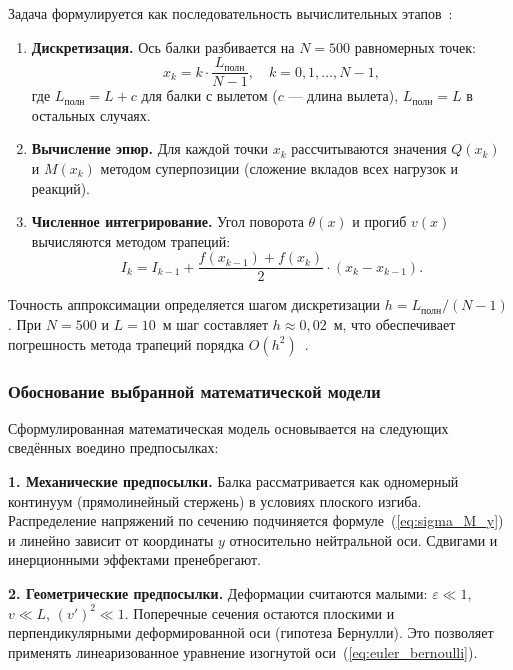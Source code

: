 Задача формулируется как последовательность вычислительных этапов~\cite{bahvalov, samarsky}:

\begin{enumerate}
  \item \textbf{Дискретизация.} Ось балки разбивается на $N = 500$ равномерных точек:
  \begin{equation}
    x_k = k \cdot \frac{L_{\text{полн}}}{N - 1}, \quad k = 0, 1, \ldots, N-1,
    \label{eq:discretization}
  \end{equation}
  где $L_{\text{полн}} = L + c$ для балки с вылетом ($c$ --- длина вылета), $L_{\text{полн}} = L$ в остальных случаях.

  \item \textbf{Вычисление эпюр.} Для каждой точки $x_k$ рассчитываются значения $Q(x_k)$ и $M(x_k)$ методом суперпозиции (сложение вкладов всех нагрузок и реакций).

  \item \textbf{Численное интегрирование.} Угол поворота $\theta(x)$ и прогиб $v(x)$ вычисляются методом трапеций:
  \begin{equation}
    I_{k} = I_{k-1} + \frac{f(x_{k-1}) + f(x_k)}{2} \cdot (x_k - x_{k-1}).
    \label{eq:trapezoid}
  \end{equation}

\end{enumerate}

Точность аппроксимации определяется шагом дискретизации $h = L_{\text{полн}} / (N-1)$. При $N = 500$ и $L = 10$~м шаг составляет $h \approx 0{,}02$~м, что обеспечивает погрешность метода трапеций порядка $O(h^2)$~\cite{bahvalov}.

\subsubsection{Обоснование выбранной математической модели}

Сформулированная математическая модель основывается на следующих сведённых воедино предпосылках:

\textbf{1. Механические предпосылки.} Балка рассматривается как одномерный континуум (прямолинейный стержень) в условиях плоского изгиба. Распределение напряжений по сечению подчиняется формуле~(\ref{eq:sigma_M_y}) и линейно зависит от координаты $y$ относительно нейтральной оси. Сдвигами и инерционными эффектами пренебрегают.

\textbf{2. Геометрические предпосылки.} Деформации считаются малыми: $\varepsilon \ll 1$, $v \ll L$, $(v')^2 \ll 1$. Поперечные сечения остаются плоскими и перпендикулярными деформированной оси (гипотеза Бернулли). Это позволяет применять линеаризованное уравнение изогнутой оси~(\ref{eq:euler_bernoulli}).

